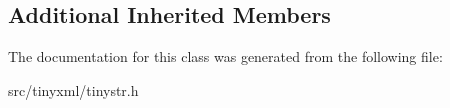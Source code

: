 \subsection*{Additional Inherited Members}


The documentation for this class was generated from the following file\+:\begin{DoxyCompactItemize}
\item 
src/tinyxml/tinystr.\+h\end{DoxyCompactItemize}
